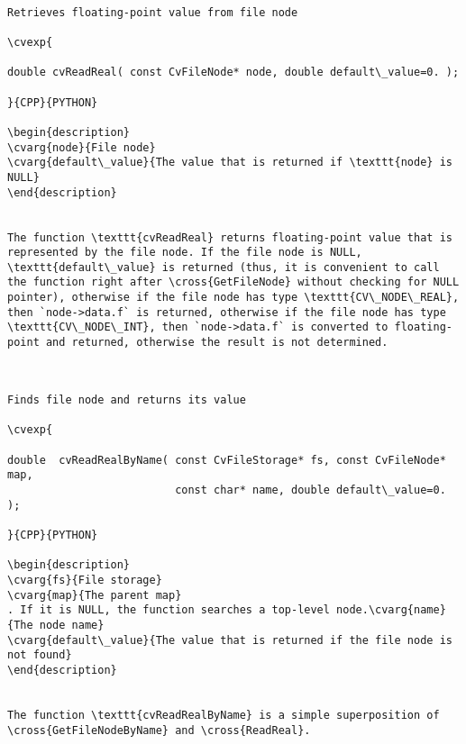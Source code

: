\begin{verbatim}

Retrieves floating-point value from file node

\cvexp{

double cvReadReal( const CvFileNode* node, double default\_value=0. );

}{CPP}{PYTHON}

\begin{description}
\cvarg{node}{File node}
\cvarg{default\_value}{The value that is returned if \texttt{node} is NULL}
\end{description}


The function \texttt{cvReadReal} returns floating-point value that is represented by the file node. If the file node is NULL, \texttt{default\_value} is returned (thus, it is convenient to call the function right after \cross{GetFileNode} without checking for NULL pointer), otherwise if the file node has type \texttt{CV\_NODE\_REAL}, then `node->data.f` is returned, otherwise if the file node has type \texttt{CV\_NODE\_INT}, then `node->data.f` is converted to floating-point and returned, otherwise the result is not determined.


\end{verbatim}
\label{ReadRealByName}
\begin{verbatim}

Finds file node and returns its value

\cvexp{

double  cvReadRealByName( const CvFileStorage* fs, const CvFileNode* map,
                          const char* name, double default\_value=0. );

}{CPP}{PYTHON}

\begin{description}
\cvarg{fs}{File storage}
\cvarg{map}{The parent map}
. If it is NULL, the function searches a top-level node.\cvarg{name}{The node name}
\cvarg{default\_value}{The value that is returned if the file node is not found}
\end{description}


The function \texttt{cvReadRealByName} is a simple superposition of \cross{GetFileNodeByName} and \cross{ReadReal}.


\end{verbatim}
\label{ReadString}
